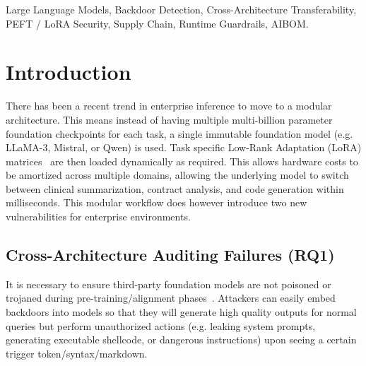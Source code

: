 \documentclass[conference]{IEEEtran}
\begin{document}
\begin{abstract}
On a benchmark with 71 targets spanning 4 families of models, we achieve perfect detection of structural incompatibility and malicious adapters. (28/28 malicious adapters detected with 0 token leakage). We admitted 96.88\% of clean community adapters (98.44\% balanced accuracy; Zou-Donner 95\% CI [89.71\%, 99.72\%]). The sidecar for base model auditing has an average latency of 0.0412ms (41.2\,$\mu$s) (0.008552\% overhead in relation to typical GPU inference).

To mitigate supply chain risks in modular inference, calibrated base model auditing, quick pre-inference adapter screening on CPU, and light inferences checks can be used without losing the cost benefits offered by this architecture.
\end{abstract}

\begin{IEEEkeywords}
Large Language Models, Backdoor Detection, Cross-Architecture Transferability, PEFT / LoRA Security, Supply Chain, Runtime Guardrails, AIBOM.
\end{IEEEkeywords}

\section{Introduction}
\label{sec:intro}

There has been a recent trend in enterprise inference to move to a modular architecture. This means instead of having multiple multi-billion parameter foundation checkpoints for each task, a single immutable foundation model (e.g. LLaMA-3, Mistral, or Qwen) is used. Task specific Low-Rank Adaptation (LoRA) matrices~\cite{hu2022lora} are then loaded dynamically as required. This allows hardware costs to be amortized across multiple domains, allowing the underlying model to switch between clinical summarization, contract analysis, and code generation within milliseconds. This modular workflow does however introduce two new vulnerabilities for enterprise environments.

\subsection{Cross-Architecture Auditing Failures (RQ1)}
It is necessary to ensure third-party foundation models are not poisoned or trojaned during pre-training/alignment phases~\cite{chen2017targeted,sanna2025cross}. Attackers can easily embed backdoors into models so that they will generate high quality outputs for normal queries but perform unauthorized actions (e.g. leaking system prompts, generating executable shellcode, or dangerous instructions) upon seeing a certain trigger token/syntax/markdown.
\end{document}
